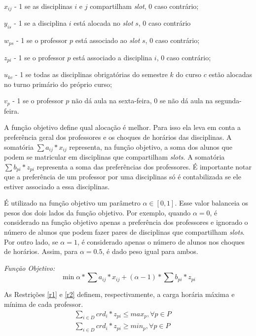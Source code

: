 \begin{alineascomponto}
    \item $x_{ij}$ - 1 se as disciplinas  $i$ e $j$ compartilham \textit{slot}, 0 caso contrário;
	\item $y_{is}$ - 1 se a disciplina $i$ está alocada no \textit{slot} $s$, 0 caso contrário
	\item $w_{ps}$ - 1 se o professor $p$ está associado ao \textit{slot} $s$, 0 caso contrário;
	\item $z_{pi}$ - 1 se o professor $p$ está associado a disciplina $i$, 0 caso contrário;
	\item $u_{kc}$ - 1 se todas as disciplinas obrigatórias do semestre $k$ do curso $c$ estão alocadas no turno primário do próprio curso;
	\item $v_p$ - 1 se o professor $p$ não dá aula na sexta-feira, 0 se não dá aula na segunda-feira.
\end{alineascomponto} 

A função objetivo define qual alocação é melhor. Para isso ela leva em conta a preferência geral dos professores e os choques de horários das disciplinas. A somatória $\sum a_{ij} * x_{ij}$ representa, na função objetivo, a soma dos alunos que podem se matricular em disciplinas que compartilham \textit{slots}. A somatória $\sum b_{pi} * z_{pi}$ representa a soma das preferências dos professores. É importante notar que a preferência de um professor por uma disciplinas só é contabilizada se ele estiver associado a essa disciplinas.

É utilizado na função objetivo um parâmetro $\alpha\in[0,1]$. Esse valor balanceia os pesos dos dois lados da função objetivo. Por exemplo, quando $\alpha = 0$, é considerado na função objetivo apenas a preferência dos professores e ignorado o número de alunos que podem fazer pares de disciplinas que compartilham \textit{slots}. Por outro lado, se $\alpha = 1$, é considerado apenas o número de alunos nos choques de horários. Assim, para $\alpha = 0.5$, é dado peso igual para ambos.

\emph{Função Objetivo:}
$$
\min{\alpha * \sum a_{ij} * x_{ij} + (\alpha-1) * \sum b_{pi} * z_{pi}}
$$

As Restrições \ref{r1} e \ref{r2} definem, respectivamente, a carga horária máxima e mínima de cada professor.
\begin{eqnarray}
\label{r1}
\sum_{i\in{D}}^{}{crd_i * z_{pi}} \le max_p, \forall{p}\in{P} &&\\
\label{r2}
\sum_{i\in{D}}^{}{crd_i * z_{pi}} \ge min_p, \forall{p}\in{P} &&
\end{eqnarray}

